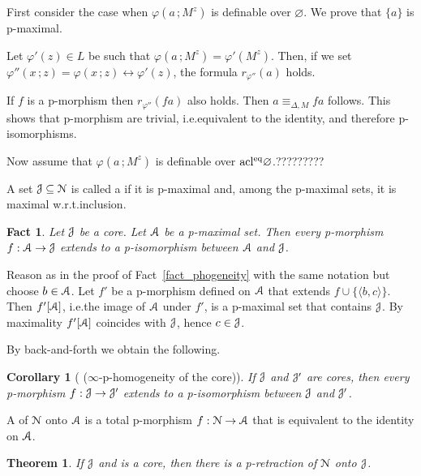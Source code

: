 \documentclass{amsproc}
\makeatletter
\def\A{\EuScript A}
\def\J{\EuScript J}
\def\N{\EuScript N}
\def\phi{\varphi}
\newcounter{thm}
\theoremstyle{mio}
\newtheorem{theorem}[thm]{Theorem}\tcolorboxenvironment{theorem}{mythm}
\newtheorem{corollary}[thm]{Corollary}\tcolorboxenvironment{corollary}{mythm}
\newtheorem{fact}[thm]{Fact}\tcolorboxenvironment{fact}{mythm}
\providecommand{\proofNameStyle}{\bfseries}
\renewenvironment{proof}[1][\proofname]{\par
  \pushQED{\qed}%
  \normalfont%
  \trivlist
  \item[\hskip\labelsep
        \proofNameStyle
    #1\@addpunct{.}]\ignorespaces
}{%
  \popQED\endtrivlist\@endpefalse
}
\renewcommand*{\emph}[1]{%
   \smash{\tikz[baseline]\node[rectangle, fill=teal!25, rounded corners, inner xsep=0.5ex, inner ysep=0.2ex, anchor=base, minimum height = 2.7ex]{\strut #1};}}
\makeatother
\begin{document}
\begin{proof}
  First consider the case when $\phi(a\,;M^z)$ is definable over $\varnothing$.
  We prove that $\{a\}$ is p-maximal.

  Let $\phi'(z)\in L$ be such that $\phi(a\,;M^z)=\phi'(M^z)$.
  Then, if we set $\phi''(x\,;z)=\phi(x\,;z)\leftrightarrow\phi'(z)$, the formula $r_{\phi''}(a)$ holds.

  If $f$ is a p-morphism then $r_{\phi''}(fa)$ also holds.
  Then $a\equiv_{\Delta,M}f\!a$ follows.
  This shows that p-morphism are trivial, i.e.\@ equivalent to the identity, and therefore p-isomorphisms.

  Now assume that $\phi(a\,;M^z)$ is definable over ${\rm acl^{eq}}\varnothing$.?????????
\end{proof}

A set $\J\subseteq\N$ is called a \emph{core} if it is p-maximal and, among the p-maximal sets, it is maximal w.r.t.\@ inclusion.

\begin{fact}\label{fact_onto}
  Let $\J$ be a core.
  Let $\A$ be a p-maximal set.
  Then every p-morphism $f:\A\to\J$ extends to a p-isomorphism between $\A$ and $\J$. 
\end{fact}

\begin{proof}
  Reason as in the proof of Fact~\ref{fact_phogeneity} with the same notation but choose $b\in\A$.
  Let $f'$ be a p-morphism defined on $\A$ that extends $f\cup\{\langle b,c\rangle\}$.
  Then $f'[\A]$, i.e.\@ the image of $\A$ under $f'$, is a p-maximal set that contains $\J$.
  By maximality $f'[\A]$ coincides with $\J$, hence $c\in\J$.
\end{proof}

By back-and-forth we obtain the following.

\begin{corollary}[ ($\infty$-p-homogeneity of the core)]\label{fact_corephogeneity}
  If $\J$ and $\J'$ are cores, then every p-morphism $f:\J\to\J'$ extends to a p-isomorphism between $\J$ and $\J'$.
\end{corollary}

A \emph{p-retraction} of $\N$ onto $\A$ is a total p-morphism $f:\N\to\A$ that is equivalent to the identity on $\A$.

\begin{theorem}
  If $\J$ and is a core, then there is a p-retraction of $\N$ onto $\J$.
\end{theorem}
\end{document}
